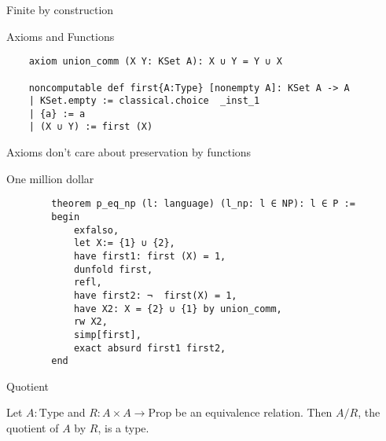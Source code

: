 \documentclass{beamer}
\begin{document}
    \begin{frame}{Finite by construction}
        
    \end{frame}
    \begin{frame}[fragile]{Axioms and Functions}
        \begin{lstlisting}
    axiom union_comm (X Y: KSet A): X ∪ Y = Y ∪ X

    noncomputable def first{A:Type} [nonempty A]: KSet A -> A
    | KSet.empty := classical.choice  _inst_1
    | {a} := a
    | (X ∪ Y) := first (X)
        \end{lstlisting}
        \begin{block}{}
            Axioms don't care about preservation by functions
        \end{block}
    \end{frame}
    \begin{frame}[fragile]{One million dollar}
        \begin{lstlisting}
        theorem p_eq_np (l: language) (l_np: l ∈ NP): l ∈ P :=
        begin
            exfalso,
            let X:= {1} ∪ {2},
            have first1: first (X) = 1,
            dunfold first,
            refl,
            have first2: ¬  first(X) = 1,
            have X2: X = {2} ∪ {1} by union_comm,
            rw X2,
            simp[first],
            exact absurd first1 first2,
        end
            \end{lstlisting}
    \end{frame}
    \begin{frame}{Quotient}
        \begin{definition}
            Let $A: \text{{Type}}$ and $R: A \times A \to \text{{Prop}}$ be an equivalence relation.
            Then $A/R$, the quotient of $A$ by $R$, is a type.
        \end{definition}


    \end{frame}
\end{document}
